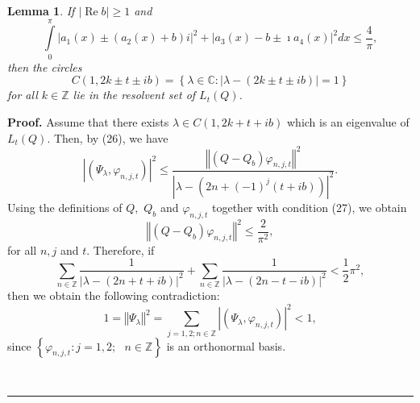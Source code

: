 \documentclass{article}%
\newtheorem{lemma}{Lemma}
{}
\newenvironment{proof}[1][Proof]{\textbf{#1.} }{\ \rule{0.5em}{0.5em}}
\begin{document}
\begin{lemma}
If $\left\vert \operatorname{Re}b\right\vert \geq1$ and
\begin{equation}
\int\limits_{0}^{\pi}\left\vert a_{1}(x)\pm\left(  a_{2}(x)+b\right)
i\right\vert ^{2}+\left\vert a_{3}(x)-b\pm\imath a_{4}(x)\right\vert
^{2}dx\leq\frac{4}{\pi}, \tag{27}%
\end{equation}
then the circles
\[
C(1,2k\pm t\pm ib)=\left\{  \lambda\in\mathbb{C}:\left\vert \lambda-(2k\pm
t\pm ib)\right\vert =1\right\}
\]
for all $k\in\mathbb{Z}$ lie in the resolvent set of $L_{t}(Q)$.
\end{lemma}

\begin{proof}
Assume that there exists $\lambda\in C(1,2k+t+ib)$ which is an eigenvalue of
$L_{t}(Q)$. Then, by (26), we have
\begin{equation}
\left\vert \left(  \Psi_{\lambda},\varphi_{n,j,t}\right)  \right\vert ^{2}%
\leq\frac{\left\Vert (Q-Q_{b})\varphi_{n,j,t}\right\Vert ^{2}}{\left\vert
\lambda-(2n+\left(  -1\right)  ^{j}(t+ib))\right\vert ^{2}}. \tag{28}%
\end{equation}
Using the definitions of $Q,$ $Q_{b}$ and $\varphi_{n,j,t}$ together with
condition (27), we obtain
\[
\left\Vert (Q-Q_{b})\varphi_{n,j,t}\right\Vert ^{2}\leq\frac{2}{\pi^{2}},
\]
for all $n,j$ and $t.$ Therefore, if
\begin{equation}
\sum_{n\in\mathbb{Z}}\frac{1}{\left\vert \lambda-(2n+t+ib)\right\vert ^{2}%
}+\sum_{n\in\mathbb{Z}}\frac{1}{\left\vert \lambda-(2n-t-ib)\right\vert ^{2}%
}<\frac{1}{2}\pi^{2}, \tag{29}%
\end{equation}
then we obtain the following contradiction:
\begin{equation}
1=\left\Vert \Psi_{\lambda}\right\Vert ^{2}=\sum_{j=1,2;n\in\mathbb{Z}%
}\left\vert \left(  \Psi_{\lambda},\varphi_{n,j,t}\right)  \right\vert ^{2}<1,
\tag{30}%
\end{equation}
since $\left\{  \varphi_{n,j,t}:j=1,2;\text{ }n\in\mathbb{Z}\right\}  $ is an
orthonormal basis.


\end{proof}
\end{document}
